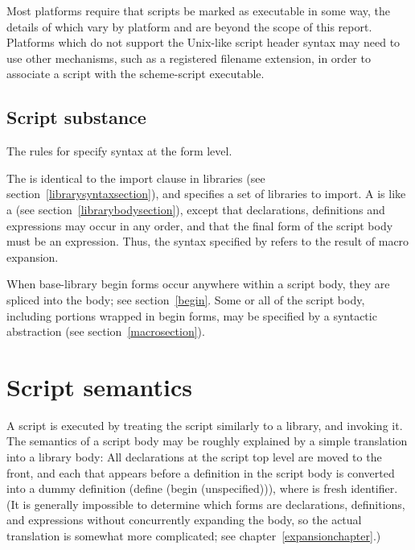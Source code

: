 Most platforms require that scripts be marked as executable in some way, 
the details of which vary by platform and are beyond the scope of this 
report. Platforms which do not support the Unix-like script header syntax 
may need to use other mechanisms, such as a registered filename extension, 
in order to associate a script with the {\cf scheme-script} executable.

\subsection{Script substance}

The rules for  specify syntax at the form level.

The  is identical to the import clause in
libraries (see section~\ref{librarysyntaxsection}), 
and specifies a set of libraries to import.  A  is like a  (see
section~\ref{librarybodysection}), except that declarations,
definitions and expressions may occur in any order, and that the final
form of the script body must be an expression.  Thus, the syntax
specified by  refers to the result of macro
expansion.

When base-library {\cf begin} forms occur anywhere within a script body,
they are spliced into the body; see section~\ref{begin}.
Some or all of the script body, including portions wrapped in {\cf begin}
forms, may be specified by a syntactic abstraction
(see section~\ref{macrosection}).

\section{Script semantics}

A script is executed by treating the script similarly to a library, and
invoking it.  The semantics of a script body may be roughly explained by
a simple translation into a library body: All declarations at the script top
level are moved to the front, and
each  that appears before a
definition in
the script body is converted into a dummy definition 
{\cf (define  (begin  (unspecified)))},
where  is fresh identifier.
(It is generally impossible to determine which forms are declarations,
definitions, and expressions without concurrently expanding the body, so
the actual translation is somewhat more complicated; see
chapter~\ref{expansionchapter}.)

